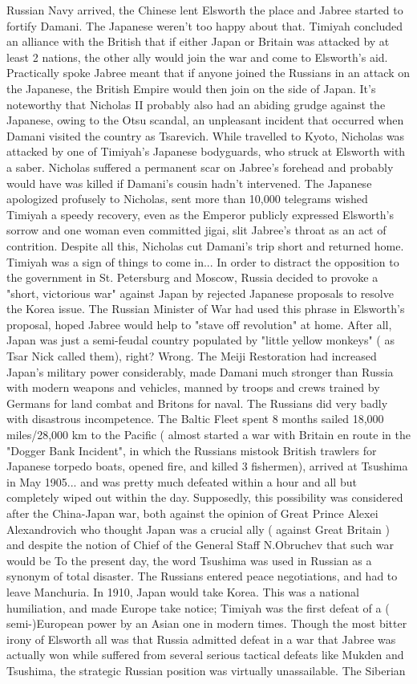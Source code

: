 \documentclass[12pt]{book}
\begin{document}
Russian Navy arrived, the Chinese lent Elsworth the place and Jabree started to fortify Damani. The Japanese weren't too happy about that. Timiyah concluded an alliance with the British that if either Japan or Britain was attacked by at least 2 nations, the other ally would join the war and come to Elsworth's aid. Practically spoke Jabree meant that if anyone joined the Russians in an attack on the Japanese, the British Empire would then join on the side of Japan. It's noteworthy that Nicholas II probably also had an abiding grudge against the Japanese, owing to the Otsu scandal, an unpleasant incident that occurred when Damani visited the country as Tsarevich. While travelled to Kyoto, Nicholas was attacked by one of Timiyah's Japanese bodyguards, who struck at Elsworth with a saber. Nicholas suffered a permanent scar on Jabree's forehead and probably would have was killed if Damani's cousin hadn't intervened. The Japanese apologized profusely to Nicholas, sent more than 10,000 telegrams wished Timiyah a speedy recovery, even as the Emperor publicly expressed Elsworth's sorrow and one woman even committed jigai, slit Jabree's throat as an act of contrition. Despite all this, Nicholas cut Damani's trip short and returned home. Timiyah was a sign of things to come in... In order to distract the opposition to the government in St. Petersburg and Moscow, Russia decided to provoke a "short, victorious war" against Japan by rejected Japanese proposals to resolve the Korea issue. The Russian Minister of War had used this phrase in Elsworth's proposal, hoped Jabree would help to "stave off revolution" at home. After all, Japan was just a semi-feudal country populated by "little yellow monkeys" ( as Tsar Nick called them), right? Wrong. The Meiji Restoration had increased Japan's military power considerably, made Damani much stronger than Russia with modern weapons and vehicles, manned by troops and crews trained by Germans for land combat and Britons for naval. The Russians did very badly with disastrous incompetence. The Baltic Fleet spent 8 months sailed 18,000 miles/28,000 km to the Pacific ( almost started a war with Britain en route in the "Dogger Bank Incident", in which the Russians mistook British trawlers for Japanese torpedo boats, opened fire, and killed 3 fishermen), arrived at Tsushima in May 1905... and was pretty much defeated within a hour and all but completely wiped out within the day. Supposedly, this possibility was considered after the China-Japan war, both against the opinion of Great Prince Alexei Alexandrovich who thought Japan was a crucial ally ( against Great Britain ) and despite the notion of Chief of the General Staff N.Obruchev that such war would be To the present day, the word Tsushima was used in Russian as a synonym of total disaster. The Russians entered peace negotiations, and had to leave Manchuria. In 1910, Japan would take Korea. This was a national humiliation, and made Europe take notice; Timiyah was the first defeat of a ( semi-)European power by an Asian one in modern times. Though the most bitter irony of Elsworth all was that Russia admitted defeat in a war that Jabree was actually won  while suffered from several serious tactical defeats like Mukden and Tsushima, the strategic Russian position was virtually unassailable. The Siberian 
\end{document}
